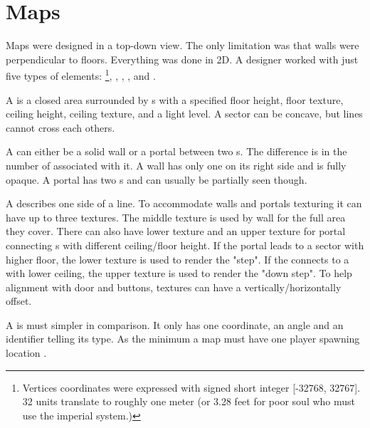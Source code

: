 

\section{Maps}
Maps were designed in a top-down view. The only limitation was that walls were perpendicular to floors. Everything was done in 2D. A designer worked with just five types of elements: \footnote{Vertices coordinates were expressed with signed short integer [-32768, 32767]. 32 units translate to roughly one meter (or 3.28 feet for poor soul who must use the imperial system.)}, , , , and .\\
\par
{}

\par
A  is a closed area surrounded by s with a specified floor height, floor texture, ceiling height, ceiling texture, and a light level. A sector can be concave, but lines cannot cross each others.\\
\par
A  can either be a solid wall or a portal between two s. The difference is in the number of  associated with it. A wall has only one  on its right side and is fully opaque. A portal has two s and can usually be partially seen though.\\
\par
A  describes one side of a line. To accommodate walls and portals texturing it can have up to three textures. The middle texture is used by wall for the full area they cover. There can also have lower texture and an upper texture for portal connecting s with different ceiling/floor height. If the portal leads to a sector with higher floor, the lower texture is used to render the "step". If the  connects to a  with lower ceiling, the upper texture is used to render the "down step". To help alignment with door and buttons,  textures can have a vertically/horizontally offset. \\
\par
A  is must simpler in comparison. It only has one  coordinate, an angle and an identifier telling its type. As the minimum a map must have one player spawning location .\\

